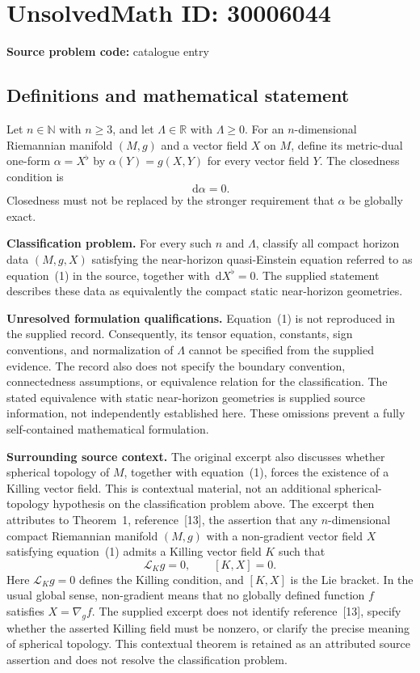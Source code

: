 \documentclass[11pt]{article}
\newcommand{\N}{\mathbb{N}}
\newcommand{\R}{\mathbb{R}}
\newcommand{\dd}{\,\mathrm{d}}
\begin{document}
\section*{UnsolvedMath ID: 30006044}
\textbf{Source problem code:} catalogue entry
\subsection{Definitions and mathematical statement}
Let \(n\in\N\) with \(n\geq3\), and let \(\Lambda\in\R\) with \(\Lambda\geq0\). For an \(n\)-dimensional Riemannian manifold \((M,g)\) and a vector field \(X\) on \(M\), define its metric-dual one-form \(\alpha=X^\flat\) by \(\alpha(Y)=g(X,Y)\) for every vector field \(Y\). The closedness condition is
\[
\dd\alpha=0.
\]
Closedness must not be replaced by the stronger requirement that \(\alpha\) be globally exact.

\textbf{Classification problem.} For every such \(n\) and \(\Lambda\), classify all compact horizon data \((M,g,X)\) satisfying the near-horizon quasi-Einstein equation referred to as equation~(1) in the source, together with \(\dd X^\flat=0\). The supplied statement describes these data as equivalently the compact static near-horizon geometries.

\textbf{Unresolved formulation qualifications.} Equation~(1) is not reproduced in the supplied record. Consequently, its tensor equation, constants, sign conventions, and normalization of \(\Lambda\) cannot be specified from the supplied evidence. The record also does not specify the boundary convention, connectedness assumptions, or equivalence relation for the classification. The stated equivalence with static near-horizon geometries is supplied source information, not independently established here. These omissions prevent a fully self-contained mathematical formulation.

\textbf{Surrounding source context.} The original excerpt also discusses whether spherical topology of \(M\), together with equation~(1), forces the existence of a Killing vector field. This is contextual material, not an additional spherical-topology hypothesis on the classification problem above. The excerpt then attributes to Theorem~1, reference~[13], the assertion that any \(n\)-dimensional compact Riemannian manifold \((M,g)\) with a non-gradient vector field \(X\) satisfying equation~(1) admits a Killing vector field \(K\) such that
\[
\mathcal L_Kg=0,\qquad [K,X]=0.
\]
Here \(\mathcal L_Kg=0\) defines the Killing condition, and \([K,X]\) is the Lie bracket. In the usual global sense, non-gradient means that no globally defined function \(f\) satisfies \(X=\nabla_g f\). The supplied excerpt does not identify reference~[13], specify whether the asserted Killing field must be nonzero, or clarify the precise meaning of spherical topology. This contextual theorem is retained as an attributed source assertion and does not resolve the classification problem.
\end{document}
